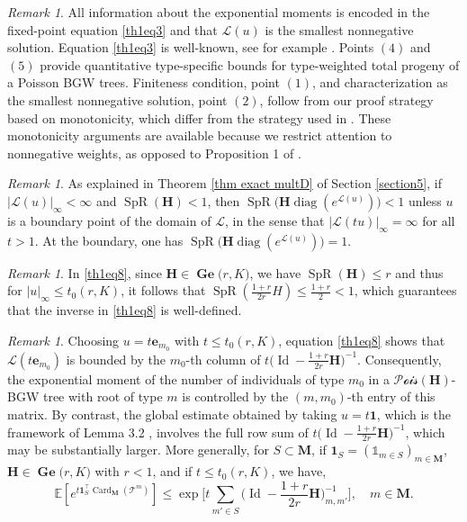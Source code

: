 \documentclass[reqno,final,11pt]{amsart}
\renewcommand{\cite}{\citet}
\theoremstyle{plain}
\theoremstyle{definition}
\theoremstyle{remark}
\newtheorem{remark}[theorem]{Remark}
\newcommand{\ind}{\mathds{1}}
\newcommand{\E}[1]{\mathds{E}\left[#1\right]}
\newcommand{\M}{\bm{M}}
\newcommand{\Ge}[2]{\bm{\Gel(} #1,#2 \bm{)} }
\newcommand{\T}{\mathcal{T}}
\renewcommand{\L}{\bm{\mathscr{L}}}
\newcommand{\ones}{\bm{1}}
\newcommand{\e}{\bm{e}}
\renewcommand{\H}{\bm{H}}
\newcommand{\Pois}{\mathscr{P}\!\mathscr{o}\!\mathscr{i}\!\mathscr{s}}
\newcommand{\trp}{^{\intercal}}
\DeclareMathOperator{\card}{Card}
\DeclareMathOperator{\diag}{diag}
\DeclareMathOperator{\spr}{SpR}
\DeclareMathOperator{\Gel}{Ge}
\DeclareMathOperator{\Id}{Id}
\begin{document}
\begin{remark}
    All information about the exponential moments is encoded in the fixed-point equation \eqref{th1eq3} and that $\L(u)$ is the smallest nonnegative solution. Equation \eqref{th1eq3} is well-known, see for example \cite{wang_total_2014, karim_compound_2025}. Points $(4)$ and $(5)$ provide quantitative type-specific bounds for type-weighted total progeny of a Poisson BGW trees. Finiteness condition, point $(1)$, and characterization as the smallest nonnegative solution, point $(2)$, follow from our proof strategy based on monotonicity, which differ from the strategy used in \cite{karim_compound_2025}. These monotonicity arguments are available because we restrict attention to nonnegative weights, as opposed to Proposition 1 of \cite{karim_compound_2025}.
\end{remark}

\begin{remark}\label{remark3.3}
	As explained in Theorem \ref{thm exact multD} of Section \ref{section5}, if $\vert \L(u)\vert_{\infty}<\infty$ and $\spr(\H)<1$, then $\spr\big(\H\diag(e^{\L(u)})\big)<1$ unless $u$ is a boundary point of the domain of $\L$, in the sense that $\vert \L(tu)\vert_{\infty}=\infty$ for all $t>1$. At the boundary, one has $\spr\big(\H\diag(e^{\L(u)})\big)=1$.
\end{remark}

\begin{remark}
	In \eqref{th1eq8}, since $\H\in\Ge{r}{K}$, we have $\spr(\H)\leq r$ and thus for $\vert u\vert_{\infty}\leq t_0(r,K)$, it follows that $\spr(\frac{1+r}{2r} H) \leq \frac{1+r}{2} <1$, which guarantees that the inverse in \eqref{th1eq8} is well-defined.
\end{remark}

\begin{remark}
	Choosing $u = t\e_{m_0}$ with $t\leq t_0(r,K)$, equation \eqref{th1eq8} shows that $\L(t\e_{m_0})$ is bounded by the $m_0$-th column of $t\big(\Id-\frac{1+r}{2r}\H\big)^{-1}$. Consequently, the exponential moment of the number of individuals of type $m_0$ in a $\Pois(\H)$-BGW tree with root of type $m$ is controlled by the $(m,m_0)$-th entry of this matrix. By contrast, the global estimate obtained by taking $u=t\ones$, which is the framework of Lemma 3.2 \cite{leblanc_exponential_2024}, involves the full row sum of $t\big(\Id-\frac{1+r}{2r}\H\big)^{-1}$, which may be substantially larger. More generally, for $S\subset \M$, if $\ones_{S} = (\ind_{m\in S})_{m\in\M}$, $\H\in\Ge{r}{K}$ with $r<1$, and if $t\leq t_0(r,K)$, we have,
	\begin{equation}
		\E{e^{t\ones_{S}\trp \card_{\M}(\T^m)}} \leq \exp\Big[t\sum_{m'\in S} \big(\Id-\frac{1+r}{2r}\H\big)^{-1}_{m,m'}\Big], \quad m\in\M. 
	\end{equation}
\end{remark}
\end{document}
